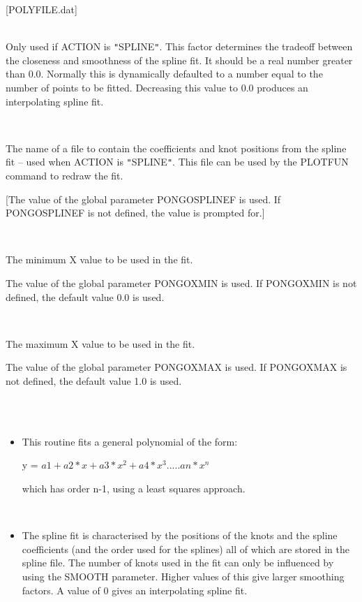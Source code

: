 \documentclass[twoside,11pt]{article}
\renewcommand{\_}{\texttt{\symbol{95}}}
\newcommand{\sstsubsection}[1]{ \item[{#1}] \mbox{} \\}
\newcommand{\sstnotes}[1]{\item[Notes:] \mbox{} \\[1.3ex] #1}
\newcommand{\sstitemlist}[1]{
  \mbox{} \\
  \vspace{-3.5ex}
  \begin{itemize}
     #1
  \end{itemize}
}
\newcommand{\sstitem}{\item}
\newcommand{\sstsubsection}[1]{\item[{#1}]}
\newcommand{\sstnotes}[1]{\item[Notes:] #1 }
\newcommand{\sstitemlist}[1]{
      \begin{itemize}
         #1
      \end{itemize}
      \\
   }
\newcommand{\sstitem}{\item}
\begin{document}
\begin{sloppypar}
{{{         [POLYFILE.dat]
      }
      \sstsubsection{
         SMOOTH = \_REAL (Read)
      }{
         Only used if ACTION is {\tt "}SPLINE{\tt "}. This factor determines the
         tradeoff between the closeness and smoothness of the spline
         fit. It should be a real number greater than 0.0. Normally this
         is dynamically defaulted to a number equal to the number of
         points to be fitted. Decreasing this value to 0.0 produces an
         interpolating spline fit.
      }
      \sstsubsection{
         SPLINEFILE = \_CHAR (Read)
      }{
         The name of a file to contain the coefficients and knot
         positions from the spline fit -- used when ACTION is
         {\tt "}SPLINE{\tt "}. This file can be used by the PLOTFUN command to
         redraw the fit.

         [The value of the global parameter PONGO\_SPLINEF is used. If
         PONGO\_SPLINEF is not defined, the value is prompted for.]
      }
      \sstsubsection{
         XMIN = \_REAL (Read)
      }{
         The minimum X value to be used in the fit.

         The value of the global parameter PONGO\_XMIN is used. If
         PONGO\_XMIN is not defined, the default value 0.0 is used.
      }
      \sstsubsection{
         XMAX = \_REAL (Read)
      }{
         The maximum X value to be used in the fit.

         The value of the global parameter PONGO\_XMAX is used. If
         PONGO\_XMAX is not defined, the default value 1.0 is used.
      }
   }
\newpage
   \sstnotes{
      \sstitemlist{

         \sstitem
         This routine fits a general polynomial of the form:

            y = $a1 + a2*x + a3*x^{2} + a4*x^{3} ..... an*x^{n}$

         which has order n-1, using a least squares approach.
      }

      \sstitemlist{

         \sstitem
         The spline fit is characterised by the positions of the knots and
         the spline coefficients (and the order used for the splines) all
         of which are stored in the spline file. The number of knots used
         in the fit can only be influenced by using the SMOOTH
         parameter. Higher values of this give larger smoothing factors. A
         value of 0 gives an interpolating spline fit.
      }
   }
}



\end{sloppypar}
\end{document}
